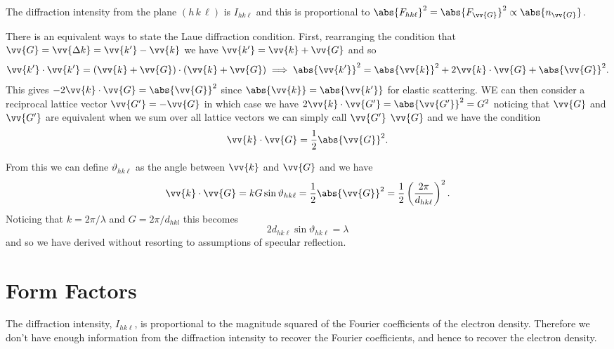 \documentclass[fleqn]{NotesClass}
\newcommand*{\crystalplane}[3]{(#1\, #2\, #3)}
\begin{document}
    The diffraction intensity from the plane \(\crystalplane{h}{k}{\ell}\) is \(I_{hk\ell}\) and this is proportional to \(\abs{F_{hk\ell}}^2 = \abs{F_{\vv{G}}}^2 \propto \abs{n_{\vv{G}}}\).
    
    There is an equivalent ways to state the Laue diffraction condition.
    First, rearranging the condition that \(\vv{G} = \vv{\Delta k} = \vv{k'} - \vv{k}\) we have \(\vv{k'} = \vv{k} + \vv{G}\) and so
    \begin{equation}
        \vv{k'}\cdot\vv{k'} = (\vv{k} + \vv{G})\cdot(\vv{k} + \vv{G}) \implies \abs{\vv{k'}}^2 = \abs{\vv{k}}^2 + 2\vv{k}\cdot\vv{G} + \abs{\vv{G}}^2.
    \end{equation}
    This gives \(-2\vv{k}\cdot\vv{G} = \abs{\vv{G}}^2\) since \(\abs{\vv{k}} = \abs{\vv{k'}}\) for elastic scattering.
    WE can then consider a reciprocal lattice vector \(\vv{G'} = -\vv{G}\) in which case we have \(2\vv{k}\cdot\vv{G'} = \abs{\vv{G'}}^2 = G^2\) noticing that \(\vv{G}\) and \(\vv{G'}\) are equivalent when we sum over all lattice vectors we can simply call \(\vv{G'}\) \(\vv{G}\) and we have the condition
    \begin{equation}
        \vv{k}\cdot\vv{G} = \frac{1}{2}\abs{\vv{G}}^2.
    \end{equation}

    From this we can define \(\vartheta_{hk\ell}\) as the angle between \(\vv{k}\) and \(\vv{G}\) and we have
    \begin{equation}
        \vv{k}\cdot\vv{G} = kG\sin\vartheta_{hk\ell} = \frac{1}{2}\abs{\vv{G}}^2 = \frac{1}{2}\left( \frac{2\pi}{d_{hk\ell}} \right)^2.
    \end{equation}
    Noticing that \(k = 2\pi/\lambda\) and \(G = 2\pi/d_{hkl}\) this becomes
    \begin{equation}
        2d_{hk\ell}\sin\vartheta_{hk\ell} = \lambda
    \end{equation}
    and so we have derived  without resorting to assumptions of specular reflection.
    
    \section{Form Factors}
    The diffraction intensity, \(I_{hk\ell}\), is proportional to the magnitude squared of the Fourier coefficients of the electron density.
    Therefore we don't have enough information from the diffraction intensity to recover the Fourier coefficients, and hence to recover the electron density.
    
\end{document}
